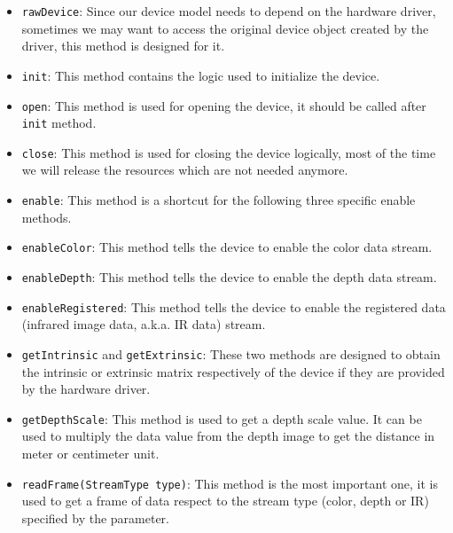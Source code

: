 \begin{itemize}
    \item \texttt{rawDevice}: Since our device model needs to depend on
    the hardware driver, sometimes we may want to access the original device
    object created by the driver, this method is designed for it.

    \item \texttt{init}: This method contains the logic used to initialize
    the device.

    \item \texttt{open}: This method is used for opening the device, it
    should be called after \texttt{init} method.

    \item \texttt{close}: This method is used for closing the device
    logically, most of the time we will release the resources which are not
    needed anymore.

    \item \texttt{enable}: This method is a shortcut for the following
    three specific enable methods.

    \item \texttt{enableColor}: This method tells the device to enable
    the color data stream.

    \item \texttt{enableDepth}: This method tells the device to enable
    the depth data stream.

    \item \texttt{enableRegistered}: This method tells the device to
    enable the registered data (infrared image data, a.k.a. IR data) stream.

    \item \texttt{getIntrinsic} and \texttt{getExtrinsic}:
    These two methods are designed to obtain the intrinsic or extrinsic matrix
    respectively of the device if they are provided by the hardware driver.

    \item \texttt{getDepthScale}: This method is used to get a depth
    scale value. It can be used to multiply the data value from the
    depth image to get the distance in meter or centimeter unit.

    \item \texttt{readFrame(StreamType type)}: This method is the
    most important one, it is used to get a frame of data respect to the stream
    type (color, depth or IR) specified by the parameter.
\end{itemize}

